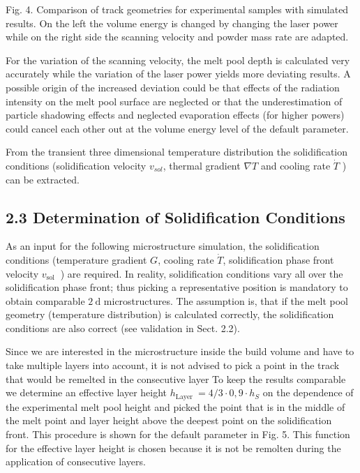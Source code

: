 \documentclass[10pt]{article}
\begin{document}
Fig. 4. Comparison of track geometries for experimental samples with simulated results. On the left the volume energy is changed by changing the laser power while on the right side the scanning velocity and powder mass rate are adapted.

For the variation of the scanning velocity, the melt pool depth is calculated very accurately while the variation of the laser power yields more deviating results. A possible origin of the increased deviation could be that effects of the radiation intensity on the melt pool surface are neglected or that the underestimation of particle shadowing effects and neglected evaporation effects (for higher powers) could cancel each other out at the volume energy level of the default parameter.

From the transient three dimensional temperature distribution the solidification conditions (solidification velocity $v_{s o l}$, thermal gradient $\nabla T$ and cooling rate $\dot{T}$ ) can be extracted.

\subsection*{2.3 Determination of Solidification Conditions}
As an input for the following microstructure simulation, the solidification conditions (temperature gradient $G$, cooling rate $\dot{T}$, solidification phase front velocity $v_{\text {sol }}$ ) are required. In reality, solidification conditions vary all over the solidification phase front; thus picking a representative position is mandatory to obtain comparable $2 \mathrm{~d}$ microstructures. The assumption is, that if the melt pool geometry (temperature distribution) is calculated correctly, the solidification conditions are also correct (see validation in Sect. 2.2).

Since we are interested in the microstructure inside the build volume and have to take multiple layers into account, it is not advised to pick a point in the track that would be remelted in the consecutive layer To keep the results comparable we determine an effective layer height $h_{\text {Layer }}=4 / 3 \cdot 0,9 \cdot h_{S}$ on the dependence of the experimental melt pool height and picked the point that is in the middle of the melt point and layer height above the deepest point on the solidification front. This procedure is shown for the default parameter in Fig. 5. This function for the effective layer height is chosen because it is not be remolten during the application of consecutive layers.
\end{document}
